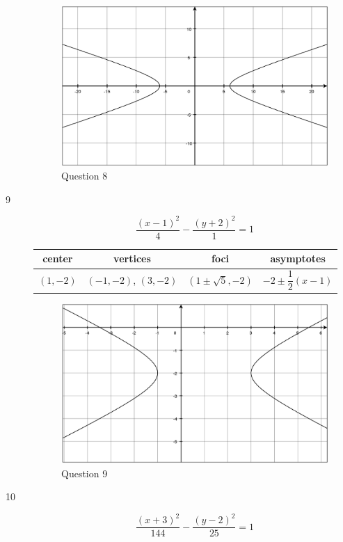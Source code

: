 \documentclass[fleqn,addpoints]{exam}
\begin{document}
\begin{description}
\begin{figure}[H]
  \centering
  \includegraphics[scale=.3]{p802_8.eps}
  \caption*{Question 8}
\end{figure}

\item[9]
\[
  \frac{(x-1)^2}{4} - \frac{(y+2)^2}{1} = 1
\]

\begin{tabular}{cccc}
\toprule
center & vertices & foci & asymptotes \\
\midrule
  $(1, -2)$ & $(-1, -2)$, $(3, -2)$ & $(1 \pm \sqrt{5}, -2)$ & $-2 \pm \dfrac{1}{2}(x-1)$ \\
\bottomrule
\end{tabular}

\begin{figure}[H]
  \centering
  \includegraphics[scale=.3]{p802_9.eps}
  \caption*{Question 9}
\end{figure}

\item[10]
\[
  \frac{(x+3)^2}{144} - \frac{(y-2)^2}{25} = 1
\]


\end{description}
\end{document}

